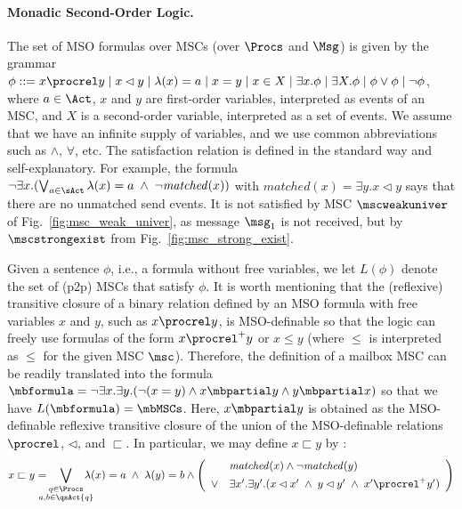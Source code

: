 
\paragraph*{Monadic Second-Order Logic.}
The set of MSO formulas over MSCs (over $\Procs$ and $\Msg$) is given by the grammar
$
\phi ::= x \procrel y \mid x \lhd y \mid \lambda(x) = a \mid x = y \mid x \in X \mid \exists x.\phi \mid \exists X.\phi \mid \phi \vee \phi \mid \neg \phi
$,
where $a \in \Act$, $x$ and $y$ are first-order variables, interpreted as
events of an MSC, and $X$ is a second-order variable, interpreted
as a set of events. We assume that we have an infinite supply of variables,
and we use common abbreviations such as $\wedge$, $\forall$, etc.
The satisfaction relation is defined in the standard way and self-explanatory.
For example, the formula $\neg\exists x.(\bigvee_{a \in \sAct} \lambda(x) = a \;\wedge\; \neg \mathit{matched}(x))$
with $\mathit{matched}(x) = \exists y.x \lhd y$
says that there are no unmatched send events.
It is not satisfied by  MSC $\mscweakuniver$
of Fig.~\ref{fig:msc_weak_univer},
as message $\msg_1$ is not received,
but by $\mscstrongexist$ from Fig.~\ref{fig:msc_strong_exist}.

Given a sentence $\phi$, i.e., a formula without free variables,
we let $L(\phi)$ denote the set of (p2p) MSCs that satisfy $\phi$.
%
It is worth mentioning that the (reflexive) transitive closure of
a binary relation defined by an MSO formula with free variables $x$ and $y$,
such as $x \procrel y$, is MSO-definable so that the logic can freely
use formulas of the form $x \procrel^+ y$ or $x \le y$ (where $\le$
is interpreted as $\le$ for the given MSC $\msc$).
Therefore, the definition of a mailbox MSC can be readily translated into
the formula $\mbformula = \neg \exists x.\exists y.(\neg (x = y) \wedge x \mbpartial y \wedge y \mbpartial x)$ so that we have $L(\mbformula) = \mbMSCs$.
Here, $x \mbpartial y$ is obtained as the MSO-definable reflexive transitive closure of
the union of the MSO-definable relations $\procrel$, $\lhd$, and $\sqsubset$.
In particular, we may define $x \sqsubset y$ by :
\[
x \sqsubset y =
\displaystyle
\hspace{-1em}\bigvee_{\substack{q \in \Procs\\a,b \in \qsAct{q}}}\hspace{-1em}
\lambda(x) = a \;\wedge\; \lambda(y) = b
\wedge
\left(
\begin{array}{rl}
& \mathit{matched}(x) \wedge \neg \mathit{matched}(y)\\[1ex]
\vee & \exists x'.\exists y'. (x \lhd x' \;\wedge\; y \lhd y' \;\wedge\; x' \procrel^+ y')
\end{array}
\right)
\]

